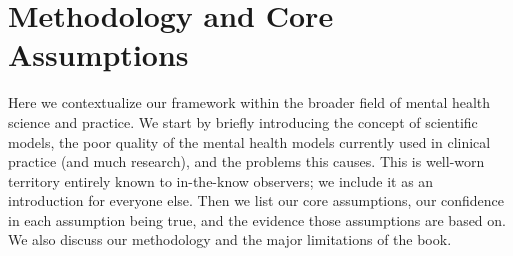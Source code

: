 \documentclass[12pt,letterpaper]{book}
\begin{document}
\section{Methodology and Core Assumptions}
\label{sec:assumptions}
Here we contextualize our framework within the broader field of mental health science and practice. We start by briefly introducing the concept of scientific models, the poor quality of the mental health models currently used in clinical practice (and much research), and the problems this causes. This is well-worn territory entirely known to in-the-know observers; we include it as an introduction for everyone else. Then we list our core assumptions, our confidence in each assumption being true, and the evidence those assumptions are based on. We also discuss our methodology and the major limitations of the book.
\end{document}
